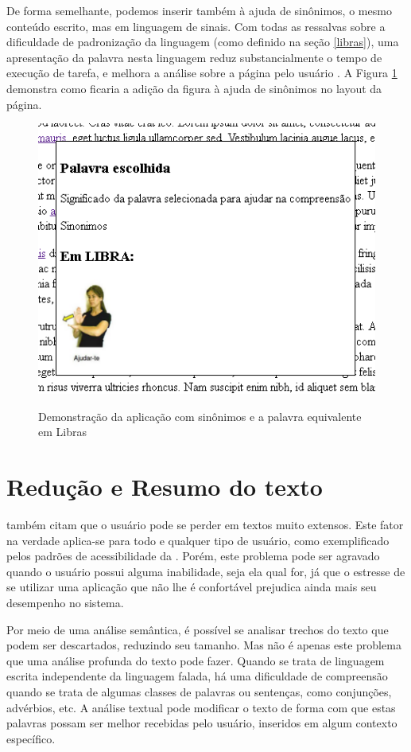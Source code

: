 \documentclass[
	12pt,				%
	oneside,			%
	a4paper,			%
	english,			%
	brazil				%
	]{abntex2ppgsi}
\begin{document}
De forma semelhante, podemos inserir também à ajuda de sinônimos, o mesmo conteúdo escrito, mas em linguagem de sinais. Com todas as ressalvas sobre a dificuldade de padronização da linguagem (como definido na seção \ref{libras}), uma apresentação da palavra nesta linguagem reduz substancialmente o tempo de execução de tarefa, e melhora a análise sobre a página pelo usuário \cite{deafPeople}. A Figura \ref{fig:prototipoLibra} demonstra como ficaria a adição da figura à ajuda de sinônimos no layout da página.

\begin{figure}[htbp]
	\centering
	\caption{Demonstração da aplicação com sinônimos e a palavra equivalente em Libras}
	\includegraphics{prototipoLibra.png}
	\label{fig:prototipoLibra}
\end{figure}

\section{Redução e Resumo do texto}

 também citam que o usuário pode se perder em textos muito extensos. Este fator na verdade aplica-se para todo e qualquer tipo de usuário, como exemplificado pelos padrões de acessibilidade da . Porém, este problema pode ser agravado quando o usuário possui alguma inabilidade, seja ela qual for, já que o estresse de se utilizar uma aplicação que não lhe é confortável prejudica ainda mais seu desempenho no sistema. 

Por meio de uma análise semântica, é possível se analisar trechos do texto que podem ser descartados, reduzindo seu tamanho. Mas não é apenas este problema que uma análise profunda do texto pode fazer. Quando se trata de linguagem escrita independente da linguagem falada, há uma dificuldade de compreensão quando se trata de algumas classes de palavras ou sentenças, como conjunções, advérbios, etc. A análise textual pode modificar o texto de forma com que estas palavras possam ser melhor recebidas pelo usuário, inseridos em algum contexto específico.
\end{document}
